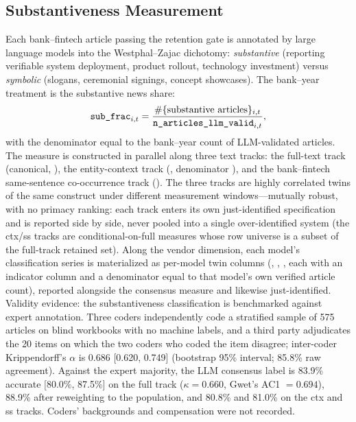 \subsection{Substantiveness Measurement}
Each bank--fintech article passing the retention gate is annotated by large
language models into the Westphal--Zajac dichotomy: \emph{substantive}
(reporting verifiable system deployment, product rollout, technology
investment) versus \emph{symbolic} (slogans, ceremonial signings, concept
showcases). The bank--year treatment is the substantive news share:
\begin{equation}
\texttt{sub\_frac}_{i,t}
  = \frac{\#\{\text{substantive articles}\}_{i,t}}{\texttt{n\_articles\_llm\_valid}_{i,t}},
\label{eq:subfrac}
\end{equation}
with the denominator equal to the bank--year count of LLM-validated
articles. The measure is constructed in parallel along three text tracks:
the full-text track (canonical, ), the entity-context track
(, denominator ), and
the bank--fintech same-sentence co-occurrence track ().
The three tracks are highly correlated twins of the same construct under
different measurement windows---mutually robust, with no primacy ranking:
each track enters its own just-identified specification and is reported side
by side, never pooled into a single over-identified system (the ctx/ss
tracks are conditional-on-full measures whose row universe is a subset of
the full-track retained set). Along the vendor dimension, each model's
classification series is materialized as per-model twin columns
(, ,
, each with an indicator column and a
denominator equal to that model's own verified article count), reported
alongside the consensus measure and likewise just-identified. Validity
evidence: the substantiveness classification is benchmarked against expert
annotation. Three coders independently code a stratified sample of 575
articles on blind workbooks with no machine labels, and a third party
adjudicates the 20 items on which the two coders who coded the item
disagree; inter-coder Krippendorff's $\alpha$ is 0.686 [0.620, 0.749]
(bootstrap 95\% interval; 85.8\% raw agreement). Against the expert
majority, the LLM consensus label is 83.9\% accurate [80.0\%, 87.5\%] on
the full track ($\kappa = 0.660$, Gwet's AC1 $= 0.694$), 88.9\% after
reweighting to the population, and 80.8\% and 81.0\% on the ctx and ss
tracks. Coders' backgrounds and compensation were not recorded.

